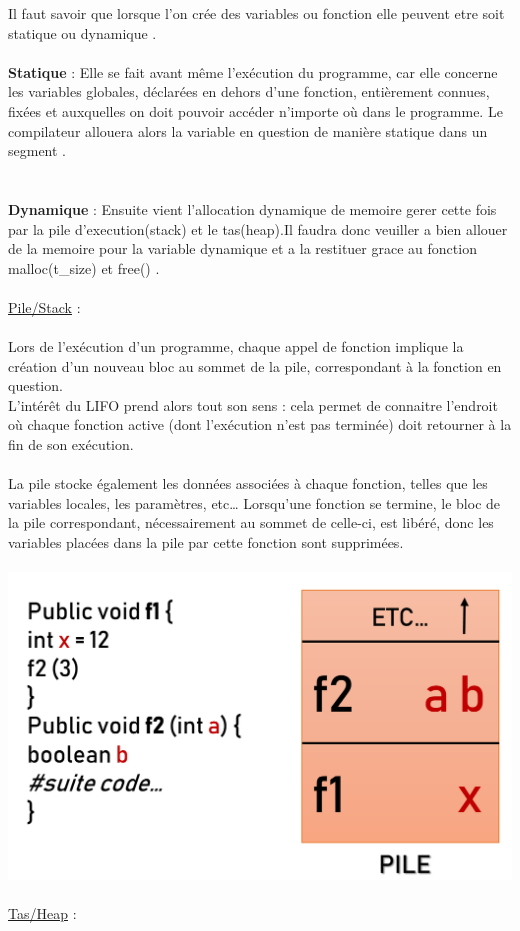 \documentclass[a4paper,12pt,openany]{book}
\begin{document}
{Il faut savoir que lorsque l'on crée des variables ou fonction elle peuvent etre soit statique ou dynamique .\\
\\
\textbf{Statique} :  Elle se fait avant même l’exécution du programme, car elle concerne les variables globales, déclarées en dehors d’une fonction, entièrement connues, fixées et auxquelles on doit pouvoir accéder n’importe où dans le programme. Le compilateur allouera alors la variable en question de manière statique dans un segment .\\
\\
\\
\textbf{Dynamique} : Ensuite vient l'allocation dynamique de memoire gerer cette fois par la pile d'execution(stack) et le tas(heap).Il faudra donc veuiller a bien allouer de la memoire pour la variable dynamique et a la restituer grace au fonction malloc(t\_size) et free() . \\
\\
\underline{Pile/Stack} : \\
\\ 
Lors de l’exécution d’un programme, chaque appel de fonction implique la création d’un nouveau bloc au sommet de la pile, correspondant à la fonction en question.\\
L’intérêt du LIFO prend alors tout son sens : cela permet de connaitre l'endroit où chaque fonction active (dont l’exécution n’est pas terminée) doit retourner à la fin de son exécution.\\
\\
La pile stocke également les données associées à chaque fonction, telles que les variables locales, les paramètres, etc… Lorsqu’une fonction se termine, le bloc de la pile correspondant, nécessairement au sommet de celle-ci, est libéré, donc les variables placées dans la pile par cette fonction sont supprimées.\\
\\
\includegraphics[width=0.5\linewidth,center]{img/pile_execution.png}\\
\\
\underline{Tas/Heap} : \\
}
\end{document}
